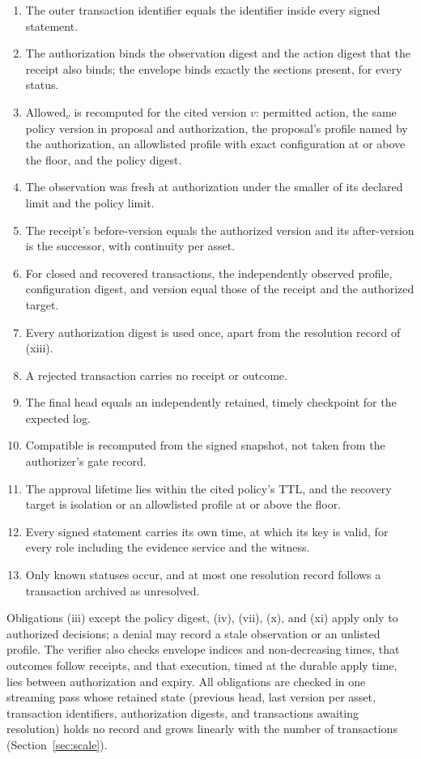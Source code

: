 \documentclass[journal]{IEEEtran}
\newcommand{\Allowed}{\mathrm{Allowed}}
\newcommand{\Compatible}{\mathrm{Compatible}}
\begin{document}
\begin{enumerate}
\item The outer transaction identifier equals the identifier inside every signed statement.
\item The authorization binds the observation digest and the action digest that the receipt also binds; the envelope binds exactly the sections present, for every status.
\item $\Allowed_v$ is recomputed for the cited version $v$: permitted action, the same policy version in proposal and authorization, the proposal's profile named by the authorization, an allowlisted profile with exact configuration at or above the floor, and the policy digest.
\item The observation was fresh at authorization under the smaller of its declared limit and the policy limit.
\item The receipt's before-version equals the authorized version and its after-version is the successor, with continuity per asset.
\item For closed and recovered transactions, the independently observed profile, configuration digest, and version equal those of the receipt and the authorized target.
\item Every authorization digest is used once, apart from the resolution record of (xiii).
\item A rejected transaction carries no receipt or outcome.
\item The final head equals an independently retained, timely checkpoint for the expected log.
\item $\Compatible$ is recomputed from the signed snapshot, not taken from the authorizer's gate record.
\item The approval lifetime lies within the cited policy's TTL, and the recovery target is isolation or an allowlisted profile at or above the floor.
\item Every signed statement carries its own time, at which its key is valid, for every role including the evidence service and the witness.
\item Only known statuses occur, and at most one resolution record follows a transaction archived as unresolved.
\end{enumerate}

Obligations (iii) except the policy digest, (iv), (vii), (x), and (xi) apply only to authorized decisions; a denial may record a stale observation or an unlisted profile. The verifier also checks envelope indices and non-decreasing times, that outcomes follow receipts, and that execution, timed at the durable apply time, lies between authorization and expiry. All obligations are checked in one streaming pass whose retained state (previous head, last version per asset, transaction identifiers, authorization digests, and transactions awaiting resolution) holds no record and grows linearly with the number of transactions (Section~\ref{sec:scale}).
\end{document}
